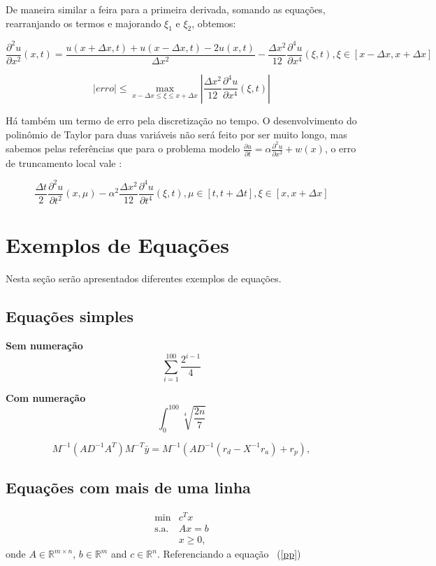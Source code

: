 \documentclass[12pt,fleqn]{article}
\newcommand{\Rn}{{\ensuremath{\mathbb{R}}}^{n}}
\newcommand{\Rm}{{\ensuremath{\mathbb{R}}}^{m}}
\newcommand{\Rmn}{{\ensuremath{\mathbb{R}}}^{{m}\times{n}}}
\begin{document}
De maneira similar a feira para a primeira derivada, somando as equações, rearranjando os termos e majorando $\xi_1$ e $\xi_2$, obtemos:

\[
\frac{\partial^2 u}{\partial x^2}(x, t) = \frac{u(x + \Delta x, t) + u(x - \Delta x, t) - 2 u(x, t)}{\Delta x^2} - \frac{\Delta x^2}{12} \frac{\partial^4 u}{\partial x^4} (\xi, t), \xi \in [x - \Delta x, x + \Delta x]
\]

\[
|erro| \leq \max_{x - \Delta x \leq \xi \leq x + \Delta x} |\frac{\Delta x^2}{12} \frac{\partial^4 u}{\partial x^4} (\xi, t)|
\]

Há também um termo de erro pela discretização no tempo. O desenvolvimento do polinômio de Taylor para duas variáveis não será feito por ser muito longo, mas sabemos pelas referências que para o problema modelo $\frac{\partial u}{\partial t} = \alpha \frac{\partial^2 u}{\partial x^2} + w(x)$, o erro de truncamento local vale \cite{livro}:

\[
\frac{\Delta t}{2}\frac{\partial^2 u}{\partial t^2}(x, \mu) - \alpha^2 \frac{\Delta x^2}{12}\frac{\partial^4 u}{\partial t^4}(\xi, t), \mu \in [t, t + \Delta t], \xi \in [x, x + \Delta x]
\]

\section{Exemplos de Equações}
Nesta seção serão apresentados diferentes exemplos de equações.

\subsection{Equações simples}

\textbf{Sem numeração}
\[\sum_{i=1}^{100}\frac{2^{i-1}}{4}\]

\textbf{Com numeração}
\begin{equation}
	\int_{0}^{100}\sqrt[4]{\frac{2n}{7}}
\end{equation}

\begin{equation}
M^{-1}(AD^{-1}A^T)M^{-T}\bar{y} = M^{-1}(AD^{-1}(r_d -X^{-1}r_a) + r_p),
\end{equation}


\subsection{Equações com mais de uma linha}
\begin{eqnarray}
\label{pp}
\min & c^Tx \\ \nonumber
\mbox{s.a.} & Ax=b \\ \nonumber
            & x \geq 0, \nonumber
\end{eqnarray}
onde $A \in \Rmn$, $b \in \Rm$ and $c \in \Rn$.
Referenciando a equação ~(\ref{pp})
\end{document}
